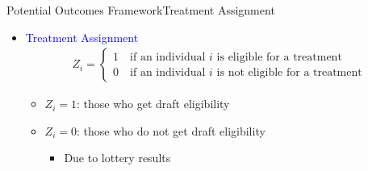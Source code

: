 \documentclass[dvipsnames,hyperref={pdfpagelabels=false}]{beamer}
\begin{document}
\begin{frame}{Potential Outcomes Framework}{Treatment Assignment}
	\begin{itemize}
		
		\item \textcolor{blue}{Treatment Assignment}
		\begin{align*}
		Z_{i}=\left\lbrace
		\begin{array}{l}
		1\quad \text{if an individual $i$ is eligible for a treatment}\\
		0\quad \text{if an individual $i$ is not eligible for a treatment}
		\end{array}\right.
		\end{align*}
		\begin{itemize}
			\item $Z_{i}=1$: those who get draft eligibility 
				\vspace{0.2cm}
				\item $Z_{i}=0$: those who do not get draft eligibility 		
						\vspace{0.2cm}
					\begin{itemize}
			\item Due to lottery results
						\end{itemize}
			
		
			\vspace{0.2cm}
		\end{itemize}
		
	\end{itemize}
\end{frame}
\end{document}
